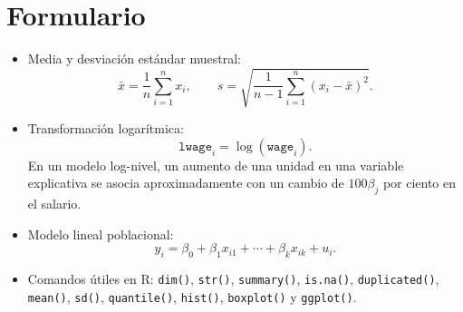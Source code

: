 \documentclass[letterpaper,11pt]{article}
\begin{document}
\newpage
\section{Formulario}

\begin{itemize}
    \item Media y desviación estándar muestral:
    \[
        \bar{x}=\frac{1}{n}\sum_{i=1}^{n}x_i,
        \qquad
        s=\sqrt{\frac{1}{n-1}\sum_{i=1}^{n}(x_i-\bar{x})^2}.
    \]

    \item Transformación logarítmica:
    \[
        \texttt{lwage}_i=\log(\texttt{wage}_i).
    \]
    En un modelo log-nivel, un aumento de una unidad en una variable
    explicativa se asocia aproximadamente con un cambio de $100\beta_j$ por
    ciento en el salario.

    \item Modelo lineal poblacional:
    \[
        y_i=\beta_0+\beta_1x_{i1}+\cdots+\beta_kx_{ik}+u_i.
    \]

    \item Comandos útiles en R: \texttt{dim()}, \texttt{str()},
    \texttt{summary()}, \texttt{is.na()}, \texttt{duplicated()},
    \texttt{mean()}, \texttt{sd()}, \texttt{quantile()}, \texttt{hist()},
    \texttt{boxplot()} y \texttt{ggplot()}.
\end{itemize}
\end{document}
